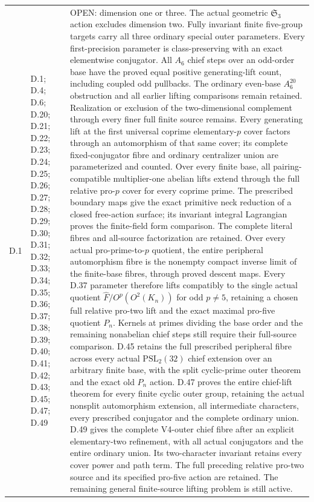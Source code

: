 \begin{longtable}{@{}p{1.1cm}p{3.0cm}p{10.3cm}@{}}
D.1 & D.1; D.4; D.6; D.20; D.21; D.22; D.23; D.24; D.25; D.26; D.27; D.28; D.29; D.30; D.31; D.32; D.33; D.34; D.35; D.36; D.37; D.38; D.39; D.40; D.41; D.42; D.43; D.45; D.47; D.49 & OPEN: dimension one or three. The actual geometric $\mathfrak S_3$ action excludes dimension two. Fully invariant finite five-group targets carry all three ordinary special outer parameters. Every first-precision parameter is class-preserving with an exact elementwise conjugator. All $A_6$ chief steps over an odd-order base have the proved equal positive generating-lift count, including coupled odd pullbacks. The ordinary even-base $A_6^{20}$ obstruction and all earlier lifting comparisons remain retained. Realization or exclusion of the two-dimensional complement through every finer full finite source remains. Every generating lift at the first universal coprime elementary-$p$ cover factors through an automorphism of that same cover; its complete fixed-conjugator fibre and ordinary centralizer union are parameterized and counted. Over every finite base, all pairing-compatible multiplier-one abelian lifts extend through the full relative pro-$p$ cover for every coprime prime. The prescribed boundary maps give the exact primitive neck reduction of a closed free-action surface; its invariant integral Lagrangian proves the finite-field form comparison. The complete literal fibres and all-source factorization are retained. Over every actual pro-prime-to-$p$ quotient, the entire peripheral automorphism fibre is the nonempty compact inverse limit of the finite-base fibres, through proved descent maps. Every D.37 parameter therefore lifts compatibly to the single actual quotient $\widehat F/O^p(O^2(K_n))$ for odd $p\ne5$, retaining a chosen full relative pro-two lift and the exact maximal pro-five quotient $P_n$. Kernels at primes dividing the base order and the remaining nonabelian chief steps still require their full-source comparison. D.45 retains the full prescribed peripheral fibre across every actual $\mathrm{PSL}_2(32)$ chief extension over an arbitrary finite base, with the split cyclic-prime outer theorem and the exact old $P_n$ action. D.47 proves the entire chief-lift theorem for every finite cyclic outer group, retaining the actual nonsplit automorphism extension, all intermediate characters, every prescribed conjugator and the complete ordinary union. D.49 gives the complete V4-outer chief fibre after an explicit elementary-two refinement, with all actual conjugators and the entire ordinary union. Its two-character invariant retains every cover power and path term. The full preceding relative pro-two source and its specified pro-five action are retained. The remaining general finite-source lifting problem is still active. \\

\end{longtable}
